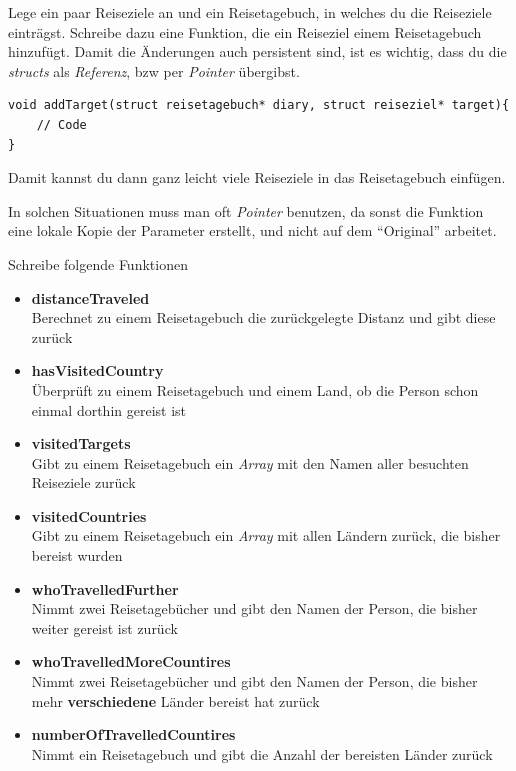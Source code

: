 \documentclass[c_worksheet.tex]{subfiles}
\begin{document}
Lege ein paar Reiseziele an und ein Reisetagebuch, in welches du die Reiseziele einträgst. Schreibe dazu eine Funktion, die ein Reiseziel einem Reisetagebuch hinzufügt. Damit die Änderungen auch persistent sind, ist es wichtig, dass du die \emph{structs} als \emph{Referenz}, bzw per \emph{Pointer} übergibst.

\begin{lstlisting}
void addTarget(struct reisetagebuch* diary, struct reiseziel* target){
	// Code
}
\end{lstlisting}

Damit kannst du dann ganz leicht viele Reiseziele in das Reisetagebuch einfügen.

In solchen Situationen muss man oft \emph{Pointer} benutzen, da sonst die Funktion eine lokale Kopie der Parameter erstellt, und nicht auf dem ``Original'' arbeitet.

Schreibe folgende Funktionen

\begin{itemize}
	\item \textbf{distanceTraveled} \\
	Berechnet zu einem Reisetagebuch die zurückgelegte Distanz und gibt diese zurück
	\item \textbf{hasVisitedCountry} \\
	Überprüft zu einem Reisetagebuch und einem Land, ob die Person schon einmal dorthin gereist ist
	\item \textbf{visitedTargets} \\
	Gibt zu einem Reisetagebuch ein \emph{Array} mit den Namen aller besuchten Reiseziele zurück
	\item \textbf{visitedCountries} \\
	Gibt zu einem Reisetagebuch ein \emph{Array} mit allen Ländern zurück, die bisher bereist wurden
	\item \textbf{whoTravelledFurther} \\
	Nimmt zwei Reisetagebücher und gibt den Namen der Person, die bisher weiter gereist ist zurück
	\item \textbf{whoTravelledMoreCountires} \\
	Nimmt zwei Reisetagebücher und gibt den Namen der Person, die bisher mehr \textbf{verschiedene} Länder bereist hat zurück
	\item \textbf{numberOfTravelledCountires} \\
	Nimmt ein Reisetagebuch und gibt die Anzahl der bereisten Länder zurück 
\end{itemize}
\end{document}
